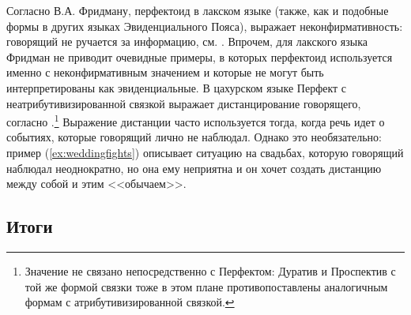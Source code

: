 Согласно В.А. Фридману, перфектоид в лакском языке (также, как и подобные формы в других языках Эвиденциального Пояса), выражает неконфирмативность: говорящий не ручается за информацию, см. \citep{friedman2000}. Впрочем, для лакского языка Фридман не приводит очевидные примеры, в которых перфектоид используется именно с неконфирмативным значением и которые не могут быть интерпретированы как эвиденциальные. В цахурском языке Перфект с неатрибутивизированной связкой выражает дистанцирование говорящего, согласно  \citep{maisaktatevosov2007}.\footnote{Значение не связано непосредственно с Перфектом: Дуратив и Проспектив с той же формой связки тоже в этом плане противопоставлены аналогичным формам с атрибутивизированной связкой.} Выражение дистанции часто используется тогда, когда речь идет о событиях, которые говорящий лично не наблюдал. Однако это необязательно: пример (\ref{ex:weddingfights}) описывает ситуацию на свадьбах, которую говорящий наблюдал неоднократно, но она ему неприятна и он хочет создать дистанцию между собой и этим <<обычаем>>.


\subsection{Итоги} \label{sec:pfitogi}

